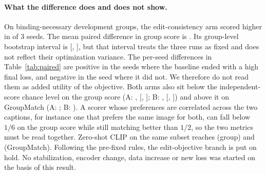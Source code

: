 \paragraph{What the difference does and does not show.}
On binding-necessary development groups, the edit-consistency arm scored higher in \PRdiffGroupPos{}
of 3 seeds. The mean paired difference in group score is \PRdiffGroup. Its group-level bootstrap
interval is [\PRdiffGroupLo, \PRdiffGroupHi], but that interval treats the three runs as fixed and
does not reflect their optimization variance. The per-seed differences in Table~\ref{tab:paired} are
positive in the seeds where the baseline ended with a high final loss, and negative in the seed
where it did not. We therefore do not read them as added utility of the objective. Both arms also
sit below the independent-score chance level on the group score (A: \PRACIGroupMean{},
[\PRACIGroupLo, \PRACIGroupHi]; B: \PRBCIGroupMean{}, [\PRBCIGroupLo, \PRBCIGroupHi]) and above it
on GroupMatch (A: \PRACIMatchMean; B: \PRBCIMatchMean). A scorer whose preferences are correlated
across the two captions, for instance one that prefers the same image for both, can fall below
$1/6$ on the group score while still matching better than $1/2$, so the two metrics must be read
together. Zero-shot CLIP on the same subset reaches \PRzsBNGroup{} (group) and \PRzsBNMatch{}
(GroupMatch). Following the pre-fixed rules, the edit-objective branch is put on hold. No
stabilization, encoder change, data increase or new loss was started on the basis of this result.
